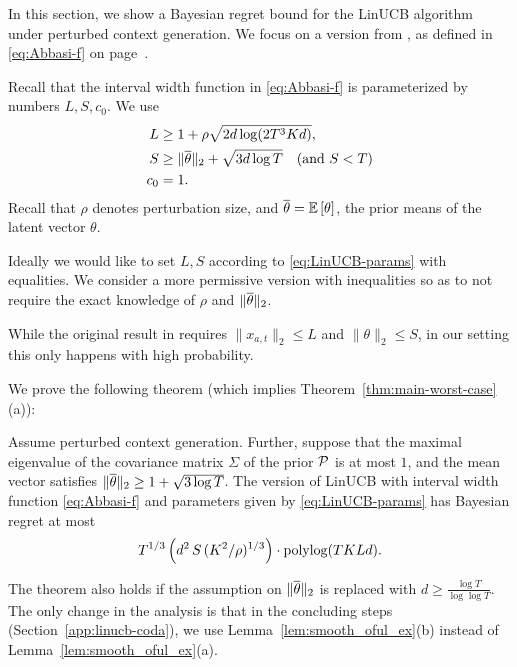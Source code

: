 In this section, we show a Bayesian regret bound for the LinUCB algorithm under perturbed context generation. We focus on a version from \citet{abbasi2011improved}, as defined in \eqref{eq:Abbasi-f} on page~\pageref{eq:Abbasi-f}.

Recall that the interval width function in \eqref{eq:Abbasi-f} is parameterized by numbers $L,S,c_0$. We use
\begin{align}
    L &\geq 1 + \rho \sqrt{2d \log(2T^3Kd)}, \nonumber \\
    S &\geq \|\overline \theta\|_2 + \sqrt{3d\log T}
    \quad \text{(and $S< T$)} \label{eq:LinUCB-params}\\
    c_0 &= 1. \nonumber
\end{align}
Recall that $\rho$ denotes perturbation size, and $\overline \theta = \mathbb{E}\left[\theta\right]$, the prior means of the latent vector $\theta$.

\begin{remark}
Ideally we would like to set $L,S$ according to \eqref{eq:LinUCB-params} with equalities. We consider a more permissive version with inequalities so as to not require the exact knowledge of $\rho$ and $\|\overline \theta\|_2$.

While the original result in \citet{abbasi2011improved} requires
    $\|x_{a,t}\|_2\leq L$ and $\|\theta\|_2\leq S$,
in our setting this only happens with high probability.
\end{remark}

We prove the following theorem (which implies Theorem~\ref{thm:main-worst-case}(a)):

\begin{theorem}
Assume perturbed context generation. Further, suppose that the maximal eigenvalue of the covariance matrix $\Sigma$ of the prior $\mathcal{P}$ is at most $1$, and the mean vector satisfies
    $\|\overline \theta\|_2\geq 1+\sqrt{3 \log T} $.
The version of LinUCB with interval width function \eqref{eq:Abbasi-f} and parameters given by \eqref{eq:LinUCB-params} has Bayesian regret at most
\begin{align}\label{eq:thm:LunUCB-main}
    T^{1/3} \left( d^2\,S\,(K^2/\rho)^{1/3} \right)\cdot \polylog(TKLd).
\end{align}
\label{thm:LunUCB-main}
\end{theorem}

\begin{remark}
The theorem also holds if the assumption on $\|\overline \theta\|_2$ is replaced with
$d \ge \frac{\log T}{\log \log T}$. The only change in the analysis is that in the concluding steps (Section~\ref{app:linucb-coda}), we use Lemma~\ref{lem:smooth_oful_ex}(b) instead of Lemma~\ref{lem:smooth_oful_ex}(a).
\end{remark}

